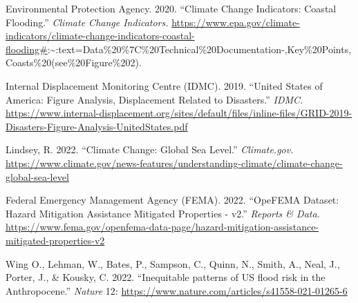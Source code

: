 \documentclass[
  12pt,
]{article}
\begin{document}
Environmental Protection Agency. 2020. ``Climate Change Indicators:
Coastal Flooding.'' \emph{Climate Change Indicators.}
\url{https://www.epa.gov/climate-indicators/climate-change-indicators-coastal-flooding\#}:\textasciitilde:text=Data\%20\%7C\%20Technical\%20Documentation-,Key\%20Points,Coasts\%20(see\%20Figure\%202).

Internal Displacement Monitoring Centre (IDMC). 2019. ``United States of
America: Figure Analysis, Displacement Related to Disasters.''
\emph{IDMC.}
\url{https://www.internal-displacement.org/sites/default/files/inline-files/GRID-2019-Disasters-Figure-Analysis-UnitedStates.pdf}

Lindsey, R. 2022. ``Climate Change: Global Sea Level.''
\emph{Climate.gov.}
\url{https://www.climate.gov/news-features/understanding-climate/climate-change-global-sea-level}

Federal Emergency Management Agency (FEMA). 2022. ``OpeFEMA Dataset:
Hazard Mitigation Assistance Mitigated Properties - v2.'' \emph{Reports
\& Data.}
\url{https://www.fema.gov/openfema-data-page/hazard-mitigation-assistance-mitigated-properties-v2}

Wing O., Lehman, W., Bates, P., Sampson, C., Quinn, N., Smith, A., Neal,
J., Porter, J., \& Kousky, C. 2022. ``Inequitable patterns of US flood
risk in the Anthropocene.'' \emph{Nature} 12:
\url{https://www.nature.com/articles/s41558-021-01265-6}
\end{document}
